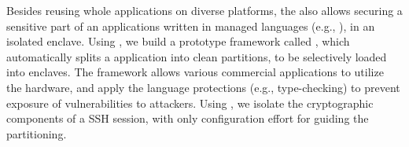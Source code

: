 Besides reusing whole applications on diverse platforms,
the \graphene{} \libos{} also
allows securing a sensitive part of an applications written in managed languages (e.g., \java{}), in an isolated enclave.
Using \graphene{}, we build a prototype framework called \term{\civet{}}, which
automatically splits a \java{} application into clean partitions,
to be selectively loaded into enclaves.
The framework allows various commercial \java{} applications
to utilize the \intel{} \sgx{} hardware,
and apply the \java{} language protections (e.g., type-checking) to prevent exposure of vulnerabilities to attackers.
Using \civet{}, we isolate the cryptographic components of a SSH session,
with only configuration effort for guiding the partitioning.


